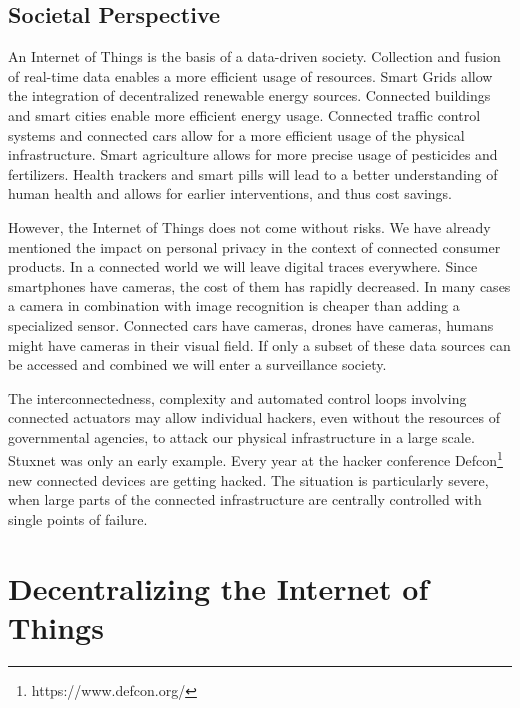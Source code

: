 \subsection{Societal Perspective}

An Internet of Things is the basis of a data-driven society. Collection and fusion of real-time data enables a more efficient usage of resources. Smart Grids allow the integration of decentralized renewable energy sources. Connected buildings and smart cities enable more efficient energy usage. Connected traffic control systems and connected cars allow for a more efficient usage of the physical infrastructure. Smart agriculture allows for more precise usage of pesticides and fertilizers. Health trackers and smart pills will lead to a better understanding of human health and allows for earlier interventions, and thus cost savings. 

However, the Internet of Things does not come without risks. We have already mentioned the impact on personal privacy in the context of connected consumer products. In a connected world we will leave digital traces everywhere. Since smartphones have cameras, the cost of them has rapidly decreased. In many cases a camera in combination with image recognition is cheaper than adding a specialized sensor. Connected cars have cameras, drones have cameras, humans might have cameras in their visual field. If only a subset of these data sources can be accessed and combined we will enter a surveillance society. 

The interconnectedness, complexity and automated control loops involving connected actuators may allow individual hackers, even without the resources of governmental agencies, to attack our physical infrastructure in a large scale. Stuxnet \parencite{5772960} was only an early example. Every year at the hacker conference Defcon\footnote{https://www.defcon.org/} new connected devices are getting hacked. The situation is particularly severe, when large parts of the connected infrastructure are centrally controlled with single points of failure. 


\section{Decentralizing the Internet of Things}

